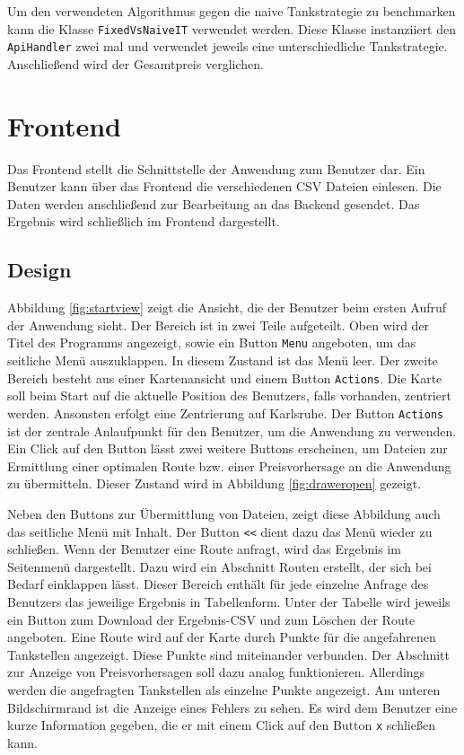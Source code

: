 \documentclass[
ngerman          %
,a4paper          %
,11pt
,pdftex
]{report}
\begin{document}
Um den verwendeten Algorithmus gegen die naive Tankstrategie zu benchmarken kann die Klasse \texttt{FixedVsNaiveIT} verwendet werden. Diese Klasse instanziiert den \texttt{ApiHandler} zwei mal und verwendet jeweils eine unterschiedliche Tankstrategie. Anschließend wird der Gesamtpreis verglichen.

\newpage
\section{Frontend}

Das Frontend stellt die Schnittstelle der Anwendung zum Benutzer dar. Ein Benutzer kann über das Frontend die verschiedenen \ac{CSV} Dateien einlesen. Die Daten werden anschließend zur Bearbeitung an das Backend gesendet. Das Ergebnis wird schließlich im Frontend dargestellt.

\subsection{Design}

Abbildung \ref{fig:startview} zeigt die Ansicht, die der Benutzer beim ersten Aufruf der Anwendung sieht. Der Bereich ist in zwei Teile aufgeteilt. Oben wird der Titel des Programms angezeigt, sowie ein Button \texttt{Menu} angeboten, um das seitliche Menü auszuklappen. In diesem Zustand ist das Menü leer. Der zweite Bereich besteht aus einer Kartenansicht und einem Button \texttt{Actions}. Die Karte soll beim Start auf die aktuelle Position des Benutzers, falls vorhanden, zentriert werden. Ansonsten erfolgt eine Zentrierung auf Karlsruhe. Der Button \texttt{Actions} ist der zentrale Anlaufpunkt für den Benutzer, um die Anwendung zu verwenden. Ein Click auf den Button lässt zwei weitere Buttons erscheinen, um Dateien zur Ermittlung einer optimalen Route bzw. einer Preisvorhersage an die Anwendung zu übermitteln. Dieser Zustand wird in Abbildung \ref{fig:draweropen} gezeigt.

Neben den Buttons zur Übermittlung von Dateien, zeigt diese Abbildung auch das seitliche Menü mit Inhalt. Der Button \texttt{<<} dient dazu das Menü wieder zu schließen. Wenn der Benutzer eine Route anfragt, wird das Ergebnis im Seitenmenü dargestellt. Dazu wird ein Abschnitt Routen erstellt, der sich bei Bedarf einklappen lässt. Dieser Bereich enthält für jede einzelne Anfrage des Benutzers das jeweilige Ergebnis in Tabellenform. Unter der Tabelle wird jeweils ein Button zum Download der Ergebnis-\ac{CSV} und zum Löschen der Route angeboten. Eine Route wird auf der Karte durch Punkte für die angefahrenen Tankstellen angezeigt. Diese Punkte sind miteinander verbunden. Der Abschnitt zur Anzeige von Preisvorhersagen soll dazu analog funktionieren. Allerdings werden die angefragten Tankstellen als einzelne Punkte angezeigt. Am unteren Bildschirmrand ist die Anzeige eines Fehlers zu sehen. Es wird dem Benutzer eine kurze Information gegeben, die er mit einem Click auf den Button \texttt{x} schließen kann.
\end{document}
